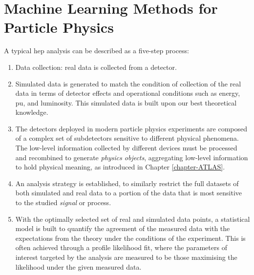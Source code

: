 \section{Machine Learning Methods for Particle Physics}
A typical \gls{hep} analysis can be described as a five-step process:
\begin{enumerate}
    \item Data collection: real data is collected from a detector. 
    \item Simulated data is generated to match the condition of collection of the real data in terms of detector effects and operational conditions such as energy, \gls{pu}, and luminosity. This simulated data is built upon our best theoretical knowledge. 
    \item The detectors deployed in modern particle physics experiments are composed of a complex set of subdetectors sensitive to different physical phenomena. The low-level information collected by different devices must be processed and recombined to generate \textit{physics objects}, aggregating low-level information to hold physical meaning, as introduced in Chapter \ref{chapter-ATLAS}.
    \item An analysis strategy is established, to similarly restrict the full datasets of both simulated and real data to a portion of the data that is most sensitive to the studied \textit{signal} or process.
    \item With the optimally selected set of real and simulated data points, a statistical model is built to quantify the agreement of the measured data with the expectations from the theory under the conditions of the experiment. This is often achieved through a profile likelihood fit, where the parameters of interest targeted by the analysis are measured to be those maximising the likelihood under the given measured data.
\end{enumerate}

